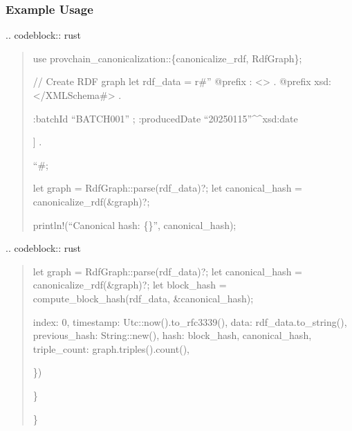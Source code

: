 \documentclass[letterpaper,10pt,english]{sphinxmanual}
\begin{document}
\subsubsection{Example Usage}
\label{\detokenize{research/rdf-canonicalization-algorithm:example-usage}}
\sphinxAtStartPar
{}
.. code\sphinxhyphen{}block:: rust
\begin{quote}

\sphinxAtStartPar
use provchain\_canonicalization::\{canonicalize\_rdf, RdfGraph\};

\sphinxAtStartPar
// Create RDF graph
let rdf\_data = r\#”
@prefix : \textless{}\textgreater{} .
@prefix xsd: \textless{}/XMLSchema\#\textgreater{} .
\begin{description}
\begin{description}
\sphinxlineitem{:hasBatch {[}}
\sphinxAtStartPar
:batchId “BATCH\sphinxhyphen{}001” ;
:producedDate “2025\sphinxhyphen{}01\sphinxhyphen{}15”\textasciicircum{}\textasciicircum{}xsd:date

\end{description}

\sphinxAtStartPar
{]} .

\end{description}

\sphinxAtStartPar
“\#;

\sphinxAtStartPar
let graph = RdfGraph::parse(rdf\_data)?;
let canonical\_hash = canonicalize\_rdf(\&graph)?;

\sphinxAtStartPar
println!(“Canonical hash: \{\}”, canonical\_hash);
\end{quote}

\sphinxAtStartPar
{}
.. code\sphinxhyphen{}block:: rust
\begin{quote}
\begin{description}
\begin{description}
\sphinxAtStartPar
let graph = RdfGraph::parse(rdf\_data)?;
let canonical\_hash = canonicalize\_rdf(\&graph)?;
let block\_hash = compute\_block\_hash(rdf\_data, \&canonical\_hash);
\begin{description}
\sphinxAtStartPar
index: 0,
timestamp: Utc::now().to\_rfc3339(),
data: rdf\_data.to\_string(),
previous\_hash: String::new(),
hash: block\_hash,
canonical\_hash,
triple\_count: graph.triples().count(),

\end{description}

\sphinxAtStartPar
\})

\end{description}

\sphinxAtStartPar
\}

\end{description}

\sphinxAtStartPar
\}
\end{quote}
\end{document}
